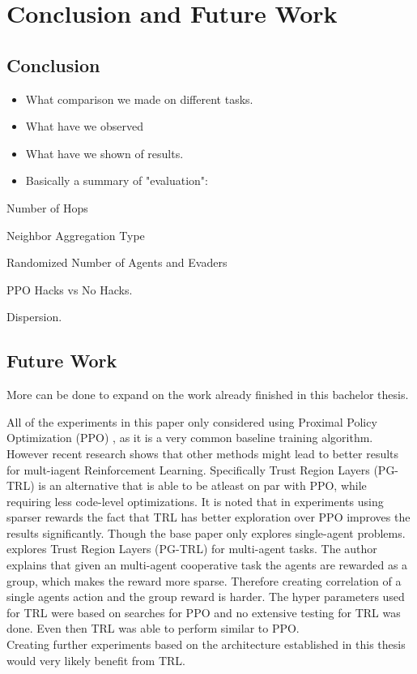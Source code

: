 
\chapter{Conclusion and Future Work}

\section{Conclusion}
\begin{itemize}[noitemsep,nolistsep]
	\item What comparison we made on different tasks.
	\item What have we observed
	\item What have we shown of results.
	\item Basically a summary of "evaluation":
\end{itemize}
Number of Hops \par

Neighbor Aggregation Type \par

Randomized Number of Agents and Evaders \par

PPO Hacks vs No Hacks. \par

Dispersion. \par


\section{Future Work}
More can be done to expand on the work already finished in this bachelor thesis.\par

All of the experiments in this paper only considered using Proximal Policy Optimization (PPO) \citet{SchulmanWDRK17}, as it is a very common baseline training algorithm.
However recent research shows that other methods might lead to better results for mult-iagent Reinforcement Learning.
Specifically Trust Region Layers (PG-TRL) \citet{otto2021differentiable} is an alternative that is able to be atleast on par with PPO, while requiring less code-level optimizations. It is noted that in experiments using sparser rewards the fact that TRL has better exploration over PPO improves the results significantly. Though the base paper only explores single-agent problems.\\
\citet{RobinRuede2021} explores Trust Region Layers (PG-TRL) \citet{otto2021differentiable} for multi-agent tasks. The author explains that given an multi-agent cooperative task the agents are rewarded as a group, which makes the reward more sparse. Therefore creating correlation of a single agents action and the group reward is harder. The hyper parameters used for TRL were based on searches for PPO and no extensive testing for TRL was done. Even then TRL was able to perform similar to PPO.\\
Creating further experiments based on the architecture established in this thesis would very likely benefit from TRL. \par

